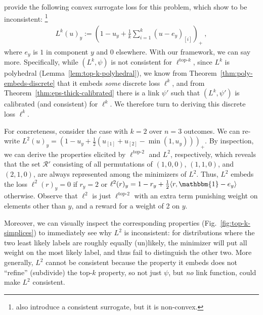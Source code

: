 \documentclass[12pt]{article}
\newcommand{\R}{\mathcal{R}}
\newcommand{\inprod}[2]{\langle #1, #2 \rangle}%
\newcommand{\ones}{\mathbbm{1}}
\newcommand{\elltopk}{\ell^{\text{top-$k$}}}
\newcommand{\elltop}[1]{\ell^{\text{top-$#1$}}}
\begin{document}
\citet{lapin2015top, lapin2016loss, lapin2018analysis} provide the following convex surrogate loss for this problem, which \citet{yang2018consistency} show to be inconsistent:%
\footnote{\citet{yang2018consistency} also introduce a consistent surrogate, but it is non-convex.}
\begin{align}\label{eq:L-2-surrogate}
L^k(u)_y := \left( 1-u_y + \tfrac{1}{k} \textstyle\sum_{i=1}^k (u - e_y)_{[i]} \right)_+~,
\end{align}
where $e_y$ is $1$ in component $y$ and 0 elsewhere.
With our framework, we can say more.
Specifically, while $(L^k,\psi)$ is not consistent for $\elltopk$, since $L^k$ is polyhedral (Lemma~\ref{lem:top-k-polyhedral}), we know from Theorem~\ref{thm:poly-embeds-discrete} that it embeds \emph{some} discrete loss $\ell^k$, and from Theorem~\ref{thm:eps-thick-calibrated} there is a link $\psi'$ such that $(L^k,\psi')$ is calibrated (and consistent) for $\ell^k$.
We therefore turn to deriving this discrete loss $\ell^k$.

For concreteness, consider the case with $k = 2$ over $n=3$ outcomes.
We can re-write $L^2(u)_y = \left(1 - u_y + \tfrac 1 2 (u_{[1]}+ u_{[2]} - \min(1,u_y))\right)_+$.
By inspection, we can derive the properties elicited by $\elltop{2}$ and $L^2$, respectively, which reveals that the set $\R'$ consisting of all permutations of $(1,0,0)$, $(1,1,0)$, and $(2,1,0)$, are always represented among the minimizers of $L^2$.
Thus, $L^2$ embeds the loss $\ell^2(r)_y = 0$ if $r_y = 2$ or $\ell^2(r)_y = 1 - r_y + \tfrac 1 2 \inprod{r}{\ones-e_y}$ otherwise.
Observe that $\ell^2$ is just $\elltop{2}$ with an extra term punishing weight on elements other than $y$, and a reward for a weight of 2 on $y$.

Moreover, we can visually inspect the corresponding properties (Fig.~\ref{fig:top-k-simplices}) to immediately see why $L^2$ is inconsistent: for distributions where the two least likely labels are roughly equally (un)likely, the minimizer will put all weight on the most likely label, and thus fail to distinguish the other two.
More generally, $L^2$ cannot be consistent because the property it embeds does not ``refine'' (subdivide) the top-$k$ property, so not just $\psi$, but \emph{no} link function, could make $L^2$ consistent.
\end{document}
